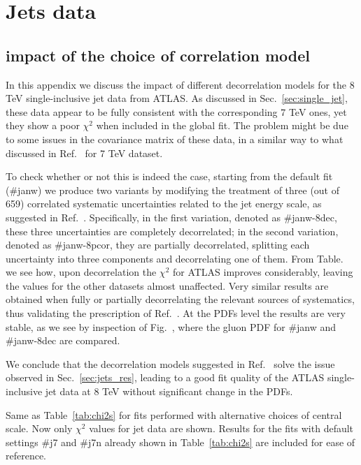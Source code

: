 \chapter{Jets data}
\label{app:jets}
\section{impact of the choice of correlation model}
In this appendix we discuss the impact of different decorrelation models for the 8 TeV single-inclusive jet data
from ATLAS.
As discussed in Sec.~\ref{sec:single_jet}, these data appear to be fully consistent with the corresponding
7 TeV ones, yet they show a poor $\chi^2$ when included in the global fit.
The problem might be due to some issues in the covariance matrix of these data, in a similar way 
to what discussed in Ref.~\cite{Harland-Lang:2017ytb} for 7 TeV dataset.

%
To check whether or not this is indeed the case, starting from the default fit (\#janw) we produce two variants 
by modifying the treatment of three (out of 659) correlated systematic uncertainties
related to the jet energy scale, as suggested in Ref.~\cite{Aaboud:2017dvo}.
Specifically, in the first variation, denoted as \#janw-8dec, these three uncertainties are completely decorrelated;
in the second variation, denoted as \#janw-8pcor, they are partially decorrelated, splitting each uncertainty 
into three components and decorrelating one of them.
From Table.~ we see how, upon decorrelation the $\chi^2$ for ATLAS improves considerably, leaving the 
values for the other datasets almost unaffected. Very similar results are obtained when fully or partially 
decorrelating the relevant sources of systematics, thus validating the prescription of Ref.~\cite{Aaboud:2017dvo}.
At the PDFs level the results are very stable, as we see by inspection of Fig.~, where the gluon PDF for 
\#janw and \#janw-8dec are compared.

%
We conclude that the decorrelation models suggested in Ref.~\cite{Aaboud:2017dvo} solve the issue observed in
Sec.~\ref{sec:jets_res}, leading to a good fit quality of the ATLAS single-inclusive jet data at 8 TeV without
significant change in the PDFs.

\begin{table}[!t]
    \renewcommand*{\arraystretch}{1.60}
    \scriptsize
    \centering
    
    \vspace{0.3cm}
    \caption{Same as Table~\ref{tab:chi2s} for
      fits performed with alternative choices of central
      scale. Now only $\chi^2$ values
      for jet data are shown. Results for the fits with default settings
      \#j7 and \#j7n  already shown  in Table~\ref{tab:chi2s} are included
      for ease of reference.}
    \label{tab:chi2_suppl}
\end{table}